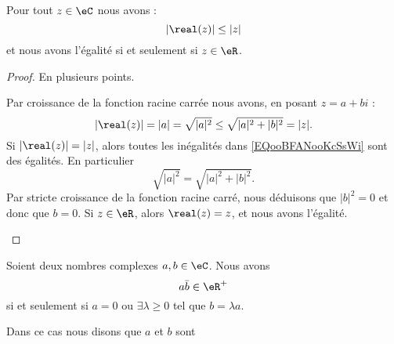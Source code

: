 \begin{proposition}	\label{PROPooPAXZooDijojx}
	Pour tout \( z\in \eC\) nous avons :
	\begin{equation}
		| \real(z) |\leq | z |
	\end{equation}
	et nous avons l'égalité si et seulement si \( z\in \eR\).
\end{proposition}

\begin{proof}
	En plusieurs points.
	\begin{subproof}
		\spitem[L'inégalité]
		Par croissance de la fonction racine carrée nous avons, en posant \( z=a+bi\) :
		\begin{equation}        \label{EQooBFANooKcSsWi}
			| \real(z) |=| a |=\sqrt{ | a |^2 }\leq \sqrt{ | a |^2+| b |^2 }=| z |.
		\end{equation}
		Si \( | \real(z) |=| z |\), alors toutes les inégalités dans \eqref{EQooBFANooKcSsWi} sont des égalités. En particulier
		\begin{equation}
			\sqrt{ | a |^2 }=\sqrt{ | a |^2+| b |^2 }.
		\end{equation}
		Par stricte croissance de la fonction racine carré, nous déduisons que \( | b |^2=0\) et donc que \( b=0\).
		Si \( z\in \eR\), alors \( \real(z)=z\), et nous avons l'égalité.
	\end{subproof}
\end{proof}


\begin{propositionDef}	\label{PROPooYLVPooCVnpFw}
	Soient deux nombres complexes \( a,b\in \eC\). Nous avons
	\begin{equation}
		a\bar b\in \eR^+
	\end{equation}
	si et seulement si \( a=0\) ou \( \exists\lambda\geq 0\) tel que \( b=\lambda a\).

	Dans ce cas nous disons que \( a\) et \( b\) sont 
\end{propositionDef}

